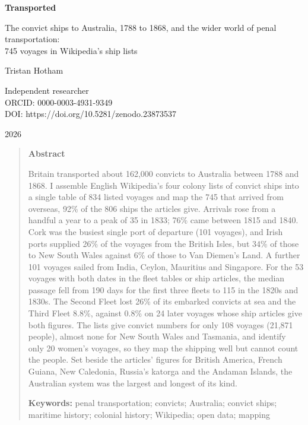 \documentclass[11pt,a4paper]{article}
\begin{document}
\begin{center}
{\Large\bfseries Transported\par}
\vspace{0.4em}
{\large The convict ships to Australia, 1788 to 1868, and the wider world of penal transportation:\\745 voyages in Wikipedia's ship lists\par}
\vspace{1.2em}
{\large Tristan Hotham\par}
\vspace{0.3em}
{\small Independent researcher\\
ORCID: 0000-0003-4931-9349\\
DOI: https://doi.org/10.5281/zenodo.23873537\par}
\vspace{0.8em}
2026
\end{center}

\begin{quote}
\small
\begin{center}\textbf{Abstract}\end{center}
Britain transported about 162,000 convicts to Australia between 1788 and 1868. I assemble English Wikipedia's four colony lists of convict ships into a single table of 834 listed voyages and map the 745 that arrived from overseas, 92\% of the 806 ships the articles give. Arrivals rose from a handful a year to a peak of 35 in 1833; 76\% came between 1815 and 1840. Cork was the busiest single port of departure (101 voyages), and Irish ports supplied 26\% of the voyages from the British Isles, but 34\% of those to New South Wales against 6\% of those to Van Diemen's Land. A further 101 voyages sailed from India, Ceylon, Mauritius and Singapore. For the 53 voyages with both dates in the fleet tables or ship articles, the median passage fell from 190 days for the first three fleets to 115 in the 1820s and 1830s. The Second Fleet lost 26\% of its embarked convicts at sea and the Third Fleet 8.8\%, against 0.8\% on 24 later voyages whose ship articles give both figures. The lists give convict numbers for only 108 voyages (21,871 people), almost none for New South Wales and Tasmania, and identify only 20 women's voyages, so they map the shipping well but cannot count the people. Set beside the articles' figures for British America, French Guiana, New Caledonia, Russia's katorga and the Andaman Islands, the Australian system was the largest and longest of its kind.

\textbf{Keywords:} penal transportation; convicts; Australia; convict ships; maritime history; colonial history; Wikipedia; open data; mapping
\end{quote}
\end{document}
